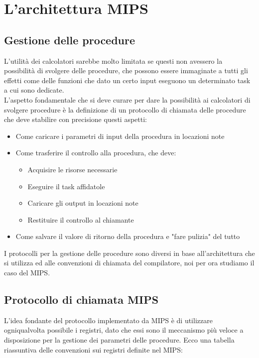 \documentclass[class=book, crop=false]{standalone}
\begin{document}
\chapter{L'architettura MIPS}
\section{Gestione delle procedure}
L'utilità dei calcolatori sarebbe molto limitata se questi non avessero la possibilità di svolgere delle procedure, che possono essere immaginate a tutti gli effetti come delle funzioni che dato un certo input eseguono un determinato task a cui sono dedicate.\\
L'aspetto fondamentale che si deve curare per dare la possibilità ai calcolatori di svolgere procedure è la definizione di un protocollo di chiamata delle procedure che deve stabilire con precisione questi aspetti:
\begin{itemize}[noitemsep]
	\item Come caricare i parametri di input della procedura in locazioni note
	\item Come trasferire il controllo alla procedura, che deve:
		\begin{itemize}[nolistsep, noitemsep]
			\item Acquisire le risorse necessarie
			\item Eseguire il task affidatole
			\item Caricare gli output in locazioni note
			\item Restituire il controllo al chiamante
		\end{itemize}
	\item Come salvare il valore di ritorno della procedura e "fare pulizia" del tutto
\end{itemize}
I protocolli per la gestione delle procedure sono diversi in base all'architettura che si utilizza ed alle convenzioni di chiamata del compilatore, noi per ora studiamo il caso del MIPS.

\section{Protocollo di chiamata MIPS}
L'idea fondante del protocollo implementato da MIPS è di utilizzare ogniqualvolta possibile i registri, dato che essi sono il meccanismo più veloce a disposizione per la gestione dei parametri delle procedure. Ecco una tabella riassuntiva delle convenzioni sui registri definite nel MIPS:

\end{document}
